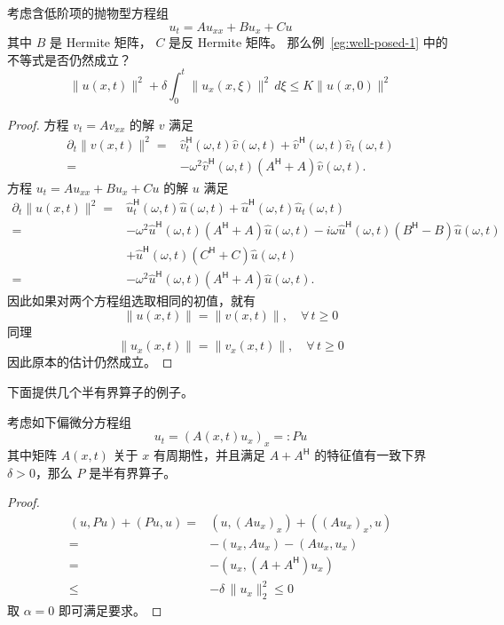 \begin{example}
    考虑含低阶项的抛物型方程组
    \[
        u_t = A u_{xx} + B u_x + C u
    \]
    其中 $B$ 是 Hermite 矩阵， $C$ 是反 Hermite 矩阵。
    那么例~\ref{eg:well-posed-1} 中的不等式是否仍然成立？
    \[
        \| u(x,t) \|^2 + \delta \int_0^t \| u_x(x,\xi) \|^2 \,d\xi \le K \| u(x,0) \|^2
    \]
\end{example}

\begin{proof}
    方程 $v_t = A v_{xx}$ 的解 $v$ 满足
    \begin{align*}
        \partial_t \| v(x,t) \|^2
        ={} & \hat{v}_t^\mathsf{H}(\omega,t) \hat{v}(\omega,t) + \hat{v}^\mathsf{H}(\omega,t) \hat{v}_t(\omega,t) \\
        ={} & - \omega^2 \hat{v}^\mathsf{H}(\omega,t) (A^\mathsf{H} + A) \hat{v}(\omega,t).
    \end{align*}
    方程 $u_t = A u_{xx} + B u_x + C u$ 的解 $u$ 满足
    \begin{align*}
        \partial_t \| u(x,t) \|^2
        ={} & \hat{u}_t^\mathsf{H}(\omega,t) \hat{u}(\omega,t) + \hat{u}^\mathsf{H}(\omega,t) \hat{u}_t(\omega,t) \\
        ={} & - \omega^2 \hat{u}^\mathsf{H}(\omega,t) (A^\mathsf{H} + A) \hat{u}(\omega,t)
        - i \omega \hat{u}^\mathsf{H}(\omega,t) (B^\mathsf{H} - B) \hat{u}(\omega,t)                              \\
            & + \hat{u}^\mathsf{H}(\omega,t)(C^\mathsf{H} + C) \hat{u}(\omega,t)                                  \\
        ={} & - \omega^2 \hat{u}^\mathsf{H}(\omega,t) (A^\mathsf{H} + A) \hat{u}(\omega,t).
    \end{align*}
    因此如果对两个方程组选取相同的初值，就有
    \[
        \| u(x,t) \| = \| v(x,t) \|,\quad \forall\, t \ge 0
    \]
    同理
    \[
        \| u_x(x,t) \| = \| v_x(x,t) \|,\quad \forall\, t \ge 0
    \]
    因此原本的估计仍然成立。
\end{proof}

下面提供几个半有界算子的例子。

\begin{example}
    考虑如下偏微分方程组
    \[
        u_t = (A(x,t) u_x)_x =: P u
    \]
    其中矩阵 $A(x,t)$ 关于 $x$ 有周期性，并且满足 $A + A^{\mathsf{H}}$ 的特征值有一致下界 $\delta > 0$，那么 $P$ 是半有界算子。
\end{example}

\begin{proof}
    \begin{align*}
        (u, P u) + (P u, u) ={} & (u, (A u_x)_x) + ((A u_x)_x, u)
        \\
        ={}                     & -(u_x, A u_x) - (A u_x, u_x)    \\
        ={}                     & -(u_x, (A+A^{\mathsf{H}})u_x)   \\
        \le                     & -\delta \, \|u_x\|_2^2 \le 0
    \end{align*}
    取 $\alpha = 0$ 即可满足要求。
\end{proof}

